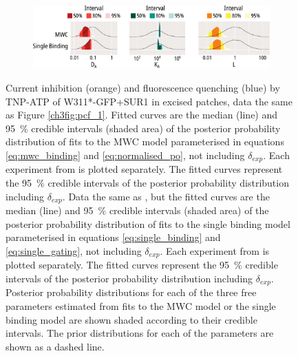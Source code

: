 \begin{figure}[hbtp]
\begin{subfigure}[t]{0.45\textwidth}
	\end{subfigure}
	\vfill
	\begin{subfigure}[t]{0.9\textwidth}
		\caption{}\label{ch4fig:w311_mwc_fit_3}
		\centering
		\includegraphics[width=\textwidth]{w311_mwc_fit_3.pdf}
	\end{subfigure}
	\caption[A concerted model explains the data better than an independent model]{
	{\bf{}}
	 Current inhibition (orange) and fluorescence quenching (blue) by TNP-ATP of W311*-GFP+SUR1 in excised patches, data the same as Figure \ref{ch3fig:pcf_1}.
	Fitted curves are the median (line) and \SI{95}{\percent} credible intervals (shaded area) of the posterior probability distribution of fits to the MWC model parameterised in equations \ref{eq:mwc_binding} and \ref{eq:normalised_po}, not including $\delta_{exp}$.
	 Each experiment from  is plotted separately.
	The fitted curves represent the \SI{95}{\percent} credible intervals of the posterior probability distribution including $\delta_{exp}$.
	 Data the same as , but the fitted curves are the median (line) and \SI{95}{\percent} credible intervals (shaded area) of the posterior probability distribution of fits to the single binding model parameterised in equations \ref{eq:single_binding} and \ref{eq:single_gating}, not including $\delta_{exp}$.
	 Each experiment from  is plotted separately.
	The fitted curves represent the \SI{95}{\percent} credible intervals of the posterior probability distribution including $\delta_{exp}$.
	 Posterior probability distributions for each of the three free parameters estimated from fits to the MWC model or the single binding model are shown shaded according to their credible intervals.
	The prior distributions for each of the parameters are shown as a dashed line.
	}\label{ch4fig:w311_model_comparison_1}
\end{figure}

